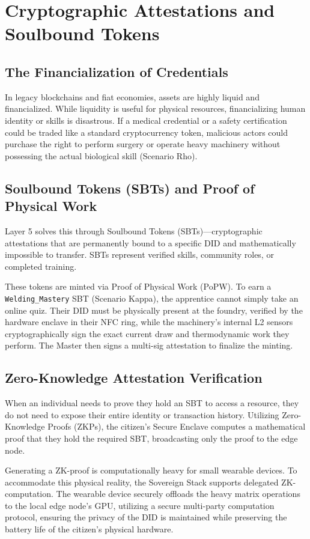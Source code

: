 \chapter{Cryptographic Attestations and Soulbound Tokens}

\section{The Financialization of Credentials}
In legacy blockchains and fiat economies, assets are highly liquid and financialized. While liquidity is useful for physical resources, financializing human identity or skills is disastrous. If a medical credential or a safety certification could be traded like a standard cryptocurrency token, malicious actors could purchase the right to perform surgery or operate heavy machinery without possessing the actual biological skill (Scenario Rho).

\section{Soulbound Tokens (SBTs) and Proof of Physical Work}
Layer 5 solves this through Soulbound Tokens (SBTs)—cryptographic attestations that are permanently bound to a specific DID and mathematically impossible to transfer. SBTs represent verified skills, community roles, or completed training.

These tokens are minted via Proof of Physical Work (PoPW). To earn a \texttt{Welding\_Mastery} SBT (Scenario Kappa), the apprentice cannot simply take an online quiz. Their DID must be physically present at the foundry, verified by the hardware enclave in their NFC ring, while the machinery's internal L2 sensors cryptographically sign the exact current draw and thermodynamic work they perform. The Master then signs a multi-sig attestation to finalize the minting.

\section{Zero-Knowledge Attestation Verification}
When an individual needs to prove they hold an SBT to access a resource, they do not need to expose their entire identity or transaction history. Utilizing Zero-Knowledge Proofs (ZKPs), the citizen's Secure Enclave computes a mathematical proof that they hold the required SBT, broadcasting only the proof to the edge node. 

Generating a ZK-proof is computationally heavy for small wearable devices. To accommodate this physical reality, the Sovereign Stack supports delegated ZK-computation. The wearable device securely offloads the heavy matrix operations to the local edge node's GPU, utilizing a secure multi-party computation protocol, ensuring the privacy of the DID is maintained while preserving the battery life of the citizen's physical hardware.

